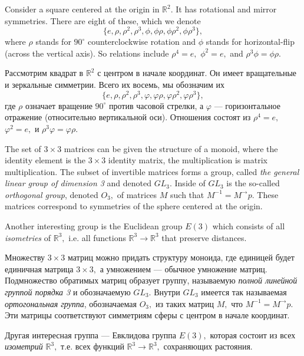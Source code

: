 \documentclass[../main/CT4S-EN-RU]{subfiles}
\begin{document}
\begin{exampleENG}
Consider a square centered at the origin in ${ℝ}^2.$ It has rotational and mirror symmetries. There are eight of these, which we denote $$\{e,\rho,\rho^2,\rho^3,\phi,\phi\rho,\phi\rho^2,\phi\rho^3\},$$ where $\rho$ stands for $90^\circ$ counterclockwise rotation and $\phi$ stands for horizontal-flip (across the vertical axis). So relations include $\rho^4=e,$ $\phi^2=e,$ and $\rho^3\phi=\phi\rho.$
\end{exampleENG}

\begin{exampleRUS}
Рассмотрим квадрат в ${ℝ}^2$ с центром в начале координат. Он имеет вращательные и зеркальные симметрии. Всего их восемь, мы обозначим их $$\{e,\rho,\rho^2,\rho^3,\varphi,\varphi\rho,\varphi\rho^2,\varphi\rho^3\},$$ где $\rho$ означает вращение $90^\circ$ против часовой стрелки, а $\varphi$ — горизонтальное отражение (относительно вертикальной оси). Отношения состоят из $\rho^4=e,$ $\varphi^2=e,$ и $\rho^3\varphi=\varphi\rho.$
\end{exampleRUS}

\begin{exampleENG}\label{ex:important groups}
The set of $3\times 3$ matrices can be given the structure of a monoid, where the identity element is the $3\times 3$ identity matrix, the multiplication is matrix multiplication. The subset of invertible matrices forms a group, called {\em the general linear group of dimension 3} and denoted $GL_3.$ Inside of $GL_3$ is the so-called {\em orthogonal group}, denoted $O_3,$ of matrices $M$ such that $M^{-1}=M^{→}p.$ These matrices correspond to symmetries of the sphere centered at the origin.

Another interesting group is the Euclidean group $E(3)$ which consists of all {\em isometries} of ${ℝ}^3,$ i.e. all functions ${ℝ}^3{→}{ℝ}^3$ that preserve distances.  
\end{exampleENG}

\begin{exampleRUS}\label{ex:important groups}
Множеству $3\times 3$ матриц можно придать структуру моноида, где единицей будет единичная матрица $3\times 3,$ а умножением — обычное умножение матриц. Подмножество обратимых матриц образует группу, называемую {\em полной линейной группой порядка 3} и обозначаемую $GL_3.$ Внутри $GL_3$ имеется так называемая {\em ортогональная группа}, обозначаемая $O_3,$ из таких матриц $M,$ что $M^{-1}=M^{→}p.$ Эти матрицы соответствуют симметриям сферы с центром в начале координат.

Другая интересная группа — Евклидова группа $E(3),$ которая состоит из всех {\em изометрий} ${ℝ}^3,$ т.е. всех функций ${ℝ}^3{→}{ℝ}^3,$ сохраняющих растояния.  
\end{exampleRUS}
\end{document}

